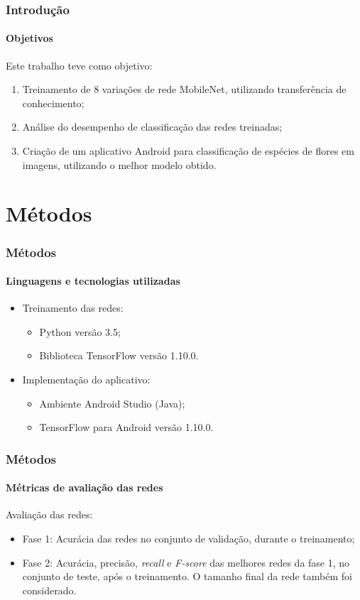 \documentclass{beamer}
\begin{document}
    \begin{frame}
      \frametitle{Introdução}
      \framesubtitle{Objetivos}
      Este trabalho teve como objetivo:\medskip
      \begin{enumerate}        
        \item<1-> Treinamento de 8 variações de rede MobileNet, utilizando transferência de conhecimento;        
        \medskip 
        \item<2-> Análise do desempenho de classificação das redes treinadas;       
        \medskip        
        \item<3-> Criação de um aplicativo Android para classificação de espécies de flores em imagens, utilizando o melhor modelo obtido.
        \medskip
      \end{enumerate}
    \end{frame}
    
    \section{Métodos} %
    \begin{frame}
      \frametitle{Métodos}
      \framesubtitle{Linguagens e tecnologias utilizadas}      
	  \begin{itemize}
        \item<1-> Treinamento das redes: \medskip
	    		\begin{itemize}
	    			\item<1-> Python versão 3.5;\medskip
	    			\item<1-> Biblioteca TensorFlow versão 1.10.0.\medskip
	    		\end{itemize}  
      \end{itemize}	
      \begin{itemize}
        \item<2-> Implementação do aplicativo: \medskip
	    		\begin{itemize}
	    			\item<2-> Ambiente Android Studio (Java); \medskip
	    			\item<2-> TensorFlow para Android versão 1.10.0. \medskip	    			
	    		\end{itemize}  
      \end{itemize}			      
    \end{frame}
        
    \begin{frame}
      \frametitle{Métodos}
      \framesubtitle{Métricas de avaliação das redes}
      \bigskip Avaliação das redes: \medskip     
	 \begin{itemize}
		\item<1-> Fase 1: Acurácia das redes no conjunto de validação, durante o treinamento;		        
        \item<2-> Fase 2: Acurácia, precisão, \textit{recall} e \textit{F-score} \cite{einstein} das 
        melhores redes da fase 1, no conjunto de teste, após o treinamento. O tamanho final da rede também foi considerado. \medskip
     \end{itemize}	       
       
    \end{frame}
        
\end{document}
